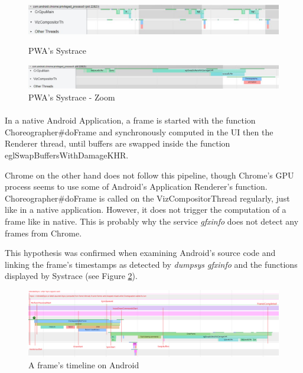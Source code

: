 \documentclass{kththesis}
\begin{document}
    \begin{figure}[!ht]
        \centering
        \includegraphics[width=15cm]{kththesis/Figures/pwa_systrace.jpg}
        \caption{PWA's Systrace}
        \label{fig:pwa_systrace}
        \includegraphics[width=15cm]{kththesis/Figures/pwa_systrace_zoom.jpg}
        \caption{PWA's Systrace - Zoom}
        \label{fig:pwa_systrace_zoom}
    \end{figure}
    
    \paragraph{}
    In a native Android Application, a frame is started with the function Choreographer\#doFrame and synchronously computed in the UI then the Renderer thread, until buffers are swapped inside the function eglSwapBuffersWithDamageKHR.
    
    Chrome on the other hand does not follow this pipeline, though Chrome's GPU process seems to use some of Android's Application Renderer's function. Choreographer\#doFrame is called on the VizCompositorThread regularly, just like in a native application. However, it does not trigger the computation of a frame like in native. This is probably why the service \textit{gfxinfo} does not detect any frames from Chrome. 
    
    This hypothesis was confirmed when examining Android's source code and linking the frame's timestamps as detected by \textit{dumpsys gfxinfo} and the functions displayed by Systrace (see Figure \ref{fig:android_frame_timeline}).
    
    \begin{figure}[!ht]
        \centering
        \includegraphics[width=13cm]{kththesis/Figures/Android_frame_timeline.png}
        \caption{A frame's timeline on Android}
        \label{fig:android_frame_timeline}
    \end{figure}
    
\end{document}

